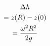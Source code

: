 \documentclass[preview]{standalone}
\begin{document}
\begin{align*}
\special{dvisvgm:raw <g id='unique000'>}\begin{gathered}\Delta h\\=z(R)-z(0)\\=\frac{\omega^2R^2}{2g}\end{gathered}\special{dvisvgm:raw </g>}
\end{align*}
\end{document}
